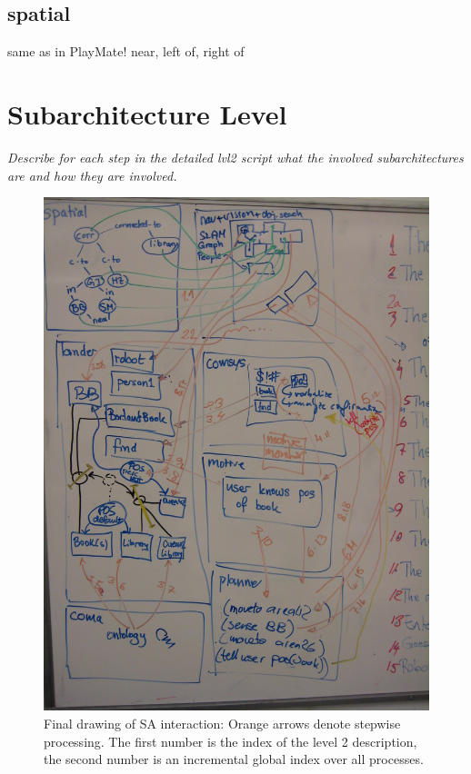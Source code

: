 \documentclass{article}
\begin{document}
\subsection{spatial}
same as in PlayMate!
near, left of, right of


\section{Subarchitecture Level}
\textit{
  Describe for each step in the detailed lvl2 script what the involved
  subarchitectures are and how they are involved.}
  
\begin{figure}[bth]
\centering
	\includegraphics[angle=-90,width=\linewidth]{ex-img_0051.jpg}
	\caption{Final drawing of SA interaction: Orange arrows denote stepwise
	processing. The first number is the index of the level 2 description, the second
	number is an incremental global index over all processes.} 
\label{fig:subarch_interaction}
\end{figure}
\end{document}
